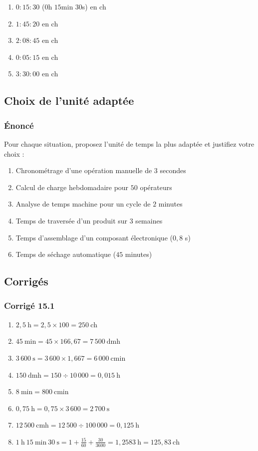 \documentclass[a4paper,12pt]{article}
\begin{document}
\begin{enumerate}
    \item $0:15:30$ ($0$h $15$min $30$s) en ch
    \item $1:45:20$ en ch
    \item $2:08:45$ en ch
    \item $0:05:15$ en ch
    \item $3:30:00$ en ch
\end{enumerate}

\subsection{Choix de l'unité adaptée}

\subsubsection*{Énoncé}

Pour chaque situation, proposez l'unité de temps la plus adaptée et justifiez votre choix :

\begin{enumerate}
    \item Chronométrage d'une opération manuelle de $3$ secondes
    \item Calcul de charge hebdomadaire pour $50$ opérateurs
    \item Analyse de temps machine pour un cycle de $2$ minutes
    \item Temps de traversée d'un produit sur $3$ semaines
    \item Temps d'assemblage d'un composant électronique ($0,8$ s)
    \item Temps de séchage automatique ($45$ minutes)
\end{enumerate}

\subsection{Corrigés}

\subsubsection*{Corrigé 15.1}

\begin{enumerate}
    \item $2,5\ \text{h} = 2,5 \times 100 = 250\ \text{ch}$
    \item $45\ \text{min} = 45 \times 166,67 = 7\,500\ \text{dmh}$
    \item $3\,600\ \text{s} = 3\,600 \times 1,667 = 6\,000\ \text{cmin}$
    \item $150\ \text{dmh} = 150 \div 10\,000 = 0,015\ \text{h}$
    \item $8\ \text{min} = 800\ \text{cmin}$
    \item $0,75\ \text{h} = 0,75 \times 3\,600 = 2\,700\ \text{s}$
    \item $12\,500\ \text{cmh} = 12\,500 \div 100\,000 = 0,125\ \text{h}$
    \item $1\ \text{h}\ 15\ \text{min}\ 30\ \text{s} = 1 + \frac{15}{60} + \frac{30}{3600} = 1,2583\ \text{h} = 125,83\ \text{ch}$
\end{enumerate}
\end{document}
